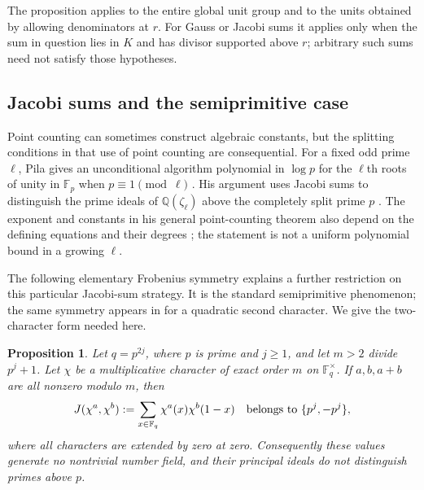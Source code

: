 \documentclass[11pt]{article}
\newtheorem{proposition}[theorem]{Proposition}
\theoremstyle{definition}
\theoremstyle{remark}
\begin{document}
The proposition applies to the entire global unit group and to
the units obtained by allowing denominators at $r$.
For Gauss or Jacobi sums it applies only when the sum in question
lies in $K$ and has divisor supported above $r$; arbitrary such
sums need not satisfy those hypotheses.

\subsection{Jacobi sums and the semiprimitive case}
Point counting can sometimes construct algebraic constants, but the
splitting conditions in that use of point counting are consequential.
For a fixed odd prime $\ell$, Pila gives an unconditional algorithm
polynomial in $\log p$ for the $\ell$th roots of unity in
$\mathbb F_p$ when $p\equiv1\pmod\ell$
\citep[Theorem~D, author p.~2]{Pila1990}.
His argument uses Jacobi sums to distinguish the prime ideals of
$\mathbb Q(\zeta_\ell)$ above the completely split prime $p$
\citep[\S5, especially Propositions~5.1--5.3, author pp.~14--18]{Pila1990}.
The exponent and constants in his general point-counting theorem
also depend on the defining equations and their degrees
\citep[Theorem~A, author p.~1]{Pila1990}; the statement is not a
uniform polynomial bound in a growing $\ell$.

The following elementary Frobenius symmetry explains a further
restriction on this particular Jacobi-sum strategy.  It is the
standard semiprimitive phenomenon; the same symmetry appears in
\citet[Lemma~1, author p.~3]{Akiyama1996} for a quadratic second
character.  We give the two-character form needed here.

\begin{proposition}\label{prop:semiprimitive-jacobi}
Let $q=p^{2j}$, where $p$ is prime and $j\ge1$, and let
$m>2$ divide $p^j+1$.  Let $\chi$ be a multiplicative character
of exact order $m$ on $\mathbb F_q^\times$.
If $a,b,a+b$ are all nonzero modulo $m$, then
\[
 J(\chi^a,\chi^b)
 :=\sum_{x\in\mathbb F_q}\chi^a(x)\chi^b(1-x)
 \quad\hbox{belongs to }\{p^j,-p^j\},
\]
where all characters are extended by zero at zero.
Consequently these values generate no nontrivial number field,
and their principal ideals do not distinguish primes above $p$.
\end{proposition}
\end{document}
